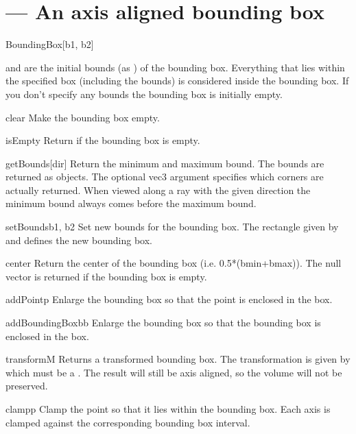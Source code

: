 
\section{ ---
         An axis aligned bounding box}

\begin{classdesc}{BoundingBox}{[b1, b2]}

 and  are the initial bounds (as ) of 
the bounding box.
Everything that lies within the specified box (including the bounds)
is considered inside the bounding box. If you don't specify any bounds
the bounding box is initially empty.
\end{classdesc}


\begin{methoddesc}{clear}{}
Make the bounding box empty.
\end{methoddesc}

\begin{methoddesc}{isEmpty}{}
Return  if the bounding box is empty.
\end{methoddesc}

\begin{methoddesc}{getBounds}{[dir]}
Return the minimum and maximum bound. The bounds are returned as
 objects. The optional vec3 argument  specifies
which corners are actually returned. When viewed along a ray with
the given direction the minimum bound always comes before the maximum
bound.
\end{methoddesc}

\begin{methoddesc}{setBounds}{b1, b2}
Set new bounds for the bounding box. The rectangle given
by  and  defines the new bounding box.
\end{methoddesc}

\begin{methoddesc}{center}{}
Return the center of the bounding box (i.e. 0.5*(bmin+bmax)).
The null vector is returned if the bounding box is empty.
\end{methoddesc}

\begin{methoddesc}{addPoint}{p}
Enlarge the bounding box so that the point  is enclosed in the box.
\end{methoddesc}

\begin{methoddesc}{addBoundingBox}{bb}
Enlarge the bounding box so that the bounding box  is enclosed in
the box.
\end{methoddesc}

\begin{methoddesc}{transform}{M}
Returns a transformed bounding box. The transformation is given by 
which must be a . The result will still be axis aligned, so the
volume will not be preserved.
\end{methoddesc}

\begin{methoddesc}{clamp}{p}
Clamp the point  so that it lies within the bounding box.
Each axis is clamped against the corresponding bounding box interval.
\end{methoddesc}
